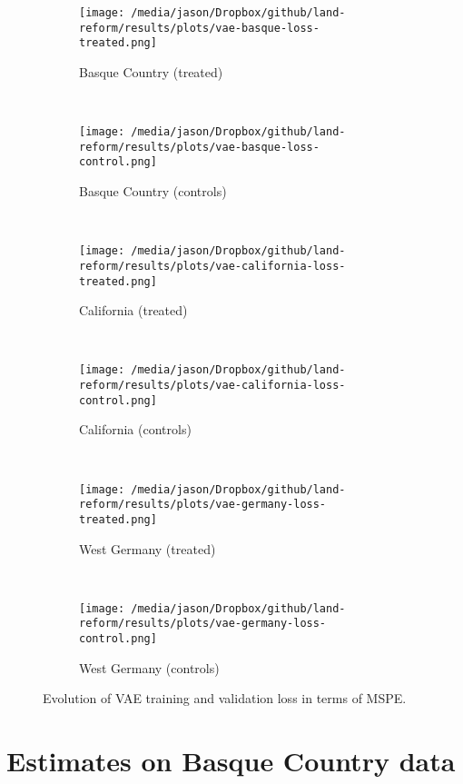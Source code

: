 \documentclass[12pt]{article}
\begin{document}
\begin{figure*}[htbp]
	\centering
	\begin{subfigure}[t]{0.4\textwidth}
		\centering
		\texttt{[image: /media/jason/Dropbox/github/land-reform/results/plots/vae-basque-loss-treated.png]}
		\caption{Basque Country (treated)}
	\end{subfigure}
	~ 
	\begin{subfigure}[t]{0.4\textwidth}
		\centering
		\texttt{[image: /media/jason/Dropbox/github/land-reform/results/plots/vae-basque-loss-control.png]}
		\caption{Basque Country (controls)}
	\end{subfigure}
	~ %
	\begin{subfigure}[t]{0.4\textwidth}
		\centering
		\texttt{[image: /media/jason/Dropbox/github/land-reform/results/plots/vae-california-loss-treated.png]}
		\caption{California (treated)}
	\end{subfigure}
	~ 
	\begin{subfigure}[t]{0.4\textwidth}
		\centering
		\texttt{[image: /media/jason/Dropbox/github/land-reform/results/plots/vae-california-loss-control.png]}
		\caption{California (controls)}
	\end{subfigure}
	~ %
	\begin{subfigure}[t]{0.4\textwidth}
		\centering
		\texttt{[image: /media/jason/Dropbox/github/land-reform/results/plots/vae-germany-loss-treated.png]}
		\caption{West Germany (treated)}
	\end{subfigure}
	~ 
	\begin{subfigure}[t]{0.4\textwidth}
		\centering
		\texttt{[image: /media/jason/Dropbox/github/land-reform/results/plots/vae-germany-loss-control.png]}
		\caption{West Germany (controls)}
	\end{subfigure}
	\caption{Evolution of VAE training and validation loss in terms of MSPE. \label{vae-loss-scm}} 
\end{figure*}

\section{Estimates on Basque Country data}
\end{document}
